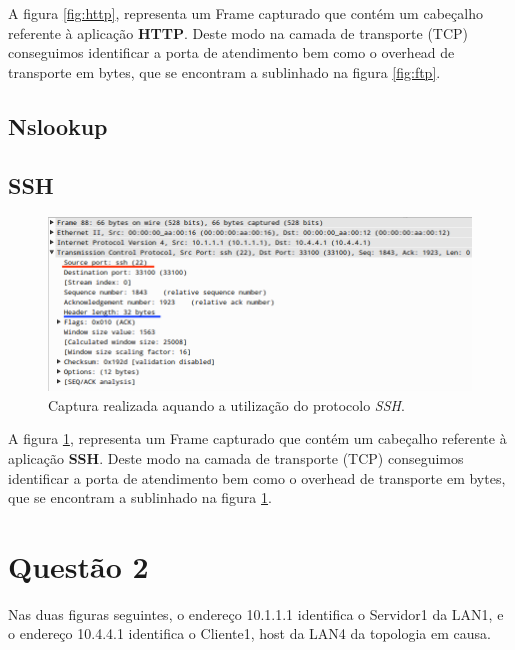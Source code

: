 \documentclass{llncs}
\begin{document}
A figura \ref{fig:http}, representa um Frame capturado que contém um cabeçalho referente à aplicação \textbf{HTTP}. Deste modo na camada de transporte (TCP) conseguimos identificar a porta de atendimento bem como o overhead de transporte em bytes, que se encontram a sublinhado na figura \ref{fig:ftp}.


\subsection{Nslookup}



\subsection{SSH}

\begin{figure}[H]
\begin{center}
\includegraphics[scale=0.4]{ssh.png}
\end{center}
\caption{\label{fig:ssh}Captura realizada aquando a utilização do protocolo \emph{SSH}.}
\end{figure}

A figura \ref{fig:ssh}, representa um Frame capturado que contém um cabeçalho referente à aplicação \textbf{SSH}. Deste modo na camada de transporte (TCP) conseguimos identificar a porta de atendimento bem como o overhead de transporte em bytes, que se encontram a sublinhado na figura \ref{fig:ssh}.


\section{Questão 2}

Nas duas figuras seguintes, o endereço 10.1.1.1 identifica o Servidor1 da LAN1, e o endereço 10.4.4.1 identifica o Cliente1, host da LAN4 da topologia em causa.
\end{document}
